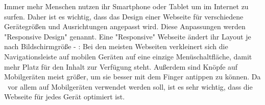 
Immer mehr Menschen nutzen ihr Smartphone oder Tablet um im Internet zu surfen. 
Daher ist es wichtig, dass das Design einer Webseite für verschiedene Gerätegrößen und Ausrichtungen angepasst wird. 
Diese Anpassungen werden "Responsive Design" genannt. 
Eine "Responsive" Webseite ändert ihr Layout je nach Bildschirmgröße - \zb: 
Bei den meisten Webseiten verkleinert sich die Navigationsleiste auf mobilen Geräten auf eine einzige Menüschaltfläche, damit mehr Platz für den Inhalt zur Verfügung steht.
Außerdem sind Knöpfe auf Mobilgeräten meist größer, um sie besser mit dem Finger antippen zu können. 
Da \ZELIA\ vor allem auf Mobilgeräten verwendet werden soll, ist es sehr wichtig, dass die Webseite für jedes Gerät optimiert ist. 

